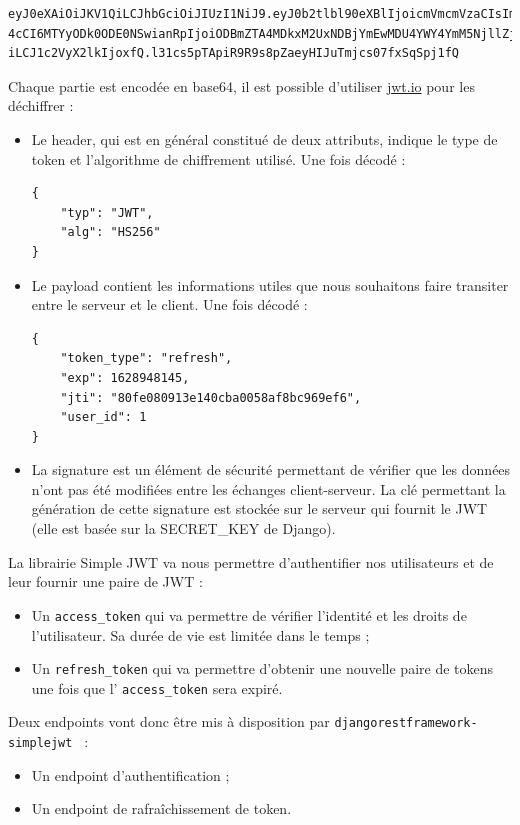 \documentclass[a4paper]{article}
\begin{document}
\begin{verbatim}
eyJ0eXAiOiJKV1QiLCJhbGciOiJIUzI1NiJ9.eyJ0b2tlbl90eXBlIjoicmVmcmVzaCIsImV
4cCI6MTYyODk0ODE0NSwianRpIjoiODBmZTA4MDkxM2UxNDBjYmEwMDU4YWY4YmM5NjllZjY
iLCJ1c2VyX2lkIjoxfQ.l31cs5pTApiR9R9s8pZaeyHIJuTmjcs07fxSqSpj1fQ
\end{verbatim} 


Chaque partie est encodée en base64, il est possible d’utiliser \href{https://jwt.io}{jwt.io} pour les déchiffrer :
\begin{itemize}
\item Le {\color{monOrange}header}, qui est en général constitué de deux attributs, indique le type de token et l'algorithme de chiffrement utilisé.
Une fois décodé :
\begin{verbatim}
{
    "typ": "JWT",
    "alg": "HS256"
}
\end{verbatim}
\item Le {\color{monOrange}payload} contient les informations utiles que nous souhaitons faire transiter entre le serveur et le client.
Une fois décodé :
\begin{verbatim}
{
    "token_type": "refresh",
    "exp": 1628948145,
    "jti": "80fe080913e140cba0058af8bc969ef6",
    "user_id": 1
}
\end{verbatim}

\item La {\color{monOrange}signature} est un élément de sécurité permettant de vérifier que les données n’ont pas été modifiées entre les échanges client-serveur. La clé permettant la génération de cette signature est stockée sur le serveur qui fournit le JWT (elle est basée sur la SECRET\_KEY de Django).

\end{itemize}
La librairie Simple JWT va nous permettre d’authentifier nos utilisateurs et de leur fournir une paire de JWT :
\begin{itemize}
\item Un {\tt access\_token}  qui va permettre de vérifier l’identité et les droits de l’utilisateur. Sa durée de vie est limitée dans le temps ;
\item Un {\tt refresh\_token}  qui va permettre d’obtenir une nouvelle paire de tokens une fois que l’ {\tt access\_token}  sera expiré.
\end{itemize}
Deux endpoints vont donc être mis à disposition par {\tt djangorestframework-simplejwt } :
\begin{itemize}
\item Un endpoint d’authentification ;
\item Un endpoint de rafraîchissement de token.
\end{itemize}
\end{document}
